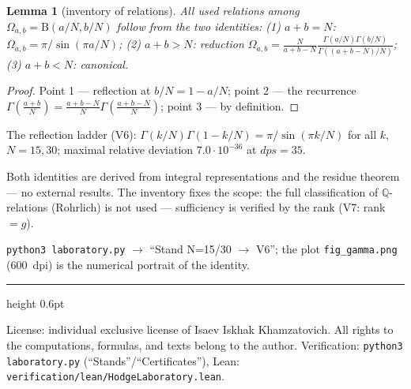 \documentclass[11pt,a4paper]{article}
\theoremstyle{plain}
\newtheorem{lemma}[theorem]{Lemma}
\theoremstyle{definition}
\theoremstyle{remark}
\newcommand{\QQ}{\mathbb{Q}}
\newcommand{\Ga}{\Gamma}
\newcommand{\Bfun}{\mathrm{B}}
\begin{document}
\begin{lemma}[inventory of relations]\label{lem:relations}
All used relations among $\Omega_{a,b}=\Bfun(a/N,b/N)$ follow from
the two identities: (1) $a+b=N$: $\Omega_{a,b}=\pi/\sin(\pi a/N)$;
(2) $a+b>N$: reduction
$\Omega_{a,b}=\frac{N}{a+b-N}\frac{\Ga(a/N)\Ga(b/N)}
{\Ga((a+b-N)/N)}$; (3) $a+b<N$: canonical.
\end{lemma}

\begin{proof}
Point 1 --- reflection at $b/N=1-a/N$; point 2 --- the recurrence
$\Ga(\frac{a+b}N)=\frac{a+b-N}N\Ga(\frac{a+b-N}N)$; point 3 ---
by definition.
\end{proof}

\begin{databox}[numbers]
The reflection ladder (V6): $\Ga(k/N)\Ga(1-k/N)=\pi/\sin(\pi k/N)$
for all $k$, $N=15,30$; maximal relative deviation
$7.0\cdot10^{-36}$ at $dps=35$.
\end{databox}

\begin{statusbox}[summary]
Both identities are derived from integral representations and the
residue theorem --- no external results. The inventory fixes the
scope: the full classification of $\QQ$-relations (Rohrlich) is not
used --- sufficiency is verified by the rank (V7: rank $=g$).
\end{statusbox}

\begin{verifybox}[reproduction]
\texttt{python3 laboratory.py} $\to$ ``Stand N=15/30 $\to$ V6'';
the plot \texttt{fig\_gamma.png} ($600$~dpi) is the numerical
portrait of the identity.
\end{verifybox}

\vfill
{\color{linkblue}\hrule height 0.6pt}
\vspace{0.5em}
{\small\color{gray}
License: individual exclusive license of Isaev Iskhak Khamzatovich.
All rights to the computations, formulas, and texts belong to the author.
Verification: \texttt{python3 laboratory.py} (``Stands''/``Certificates''),
Lean: \texttt{verification/lean/HodgeLaboratory.lean}.
}
\end{document}
